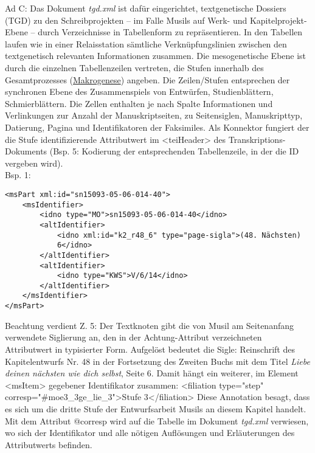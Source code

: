 \documentclass{article}
\begin{document}
        Ad C: Das Dokument \emph{tgd.xml} ist dafür eingerichtet,
                  textgenetische Dossiers (TGD) zu den Schreibprojekten – im Falle Musils auf Werk-
                  und Kapitelprojekt-Ebene – durch Verzeichnisse in Tabellenform zu repräsentieren.
                  In den Tabellen laufen wie in einer Relaisstation sämtliche Verknüpfungslinien
                  zwischen den textgenetisch relevanten Informationen zusammen. Die mesogenetische
                  Ebene ist durch die einzelnen Tabellenzeilen vertreten, die Stufen innerhalb des
                  Gesamtprozesses (\href{http://gams.uni-graz.at/o:konde.23}{Makrogenese})
                  angeben. Die Zeilen/Stufen entsprechen der synchronen Ebene des Zusammenspiels von
                  Entwürfen, Studienblättern, Schmierblättern. Die Zellen enthalten je nach Spalte
                  Informationen und Verlinkungen zur Anzahl der Manuskriptseiten, zu Seitensiglen,
                  Manuskripttyp, Datierung, Pagina und Identifikatoren der Faksimiles. Als Konnektor
                  fungiert der die Stufe identifizierende Attributwert im <teiHeader> des Transkriptions-Dokuments (Bsp. 5: Kodierung der
                  entsprechenden Tabellenzeile, in der die ID vergeben wird).\\
            
        Bsp. 1:\\
            
        \begin{verbatim}<msPart xml:id="sn15093-05-06-014-40">
    <msIdentifier>
        <idno type="MO">sn15093-05-06-014-40</idno>
        <altIdentifier>
            <idno xml:id="k2_r48_6" type="page-sigla">(48. Nächsten)
            6</idno>
        </altIdentifier>
        <altIdentifier>
            <idno type="KWS">V/6/14</idno>
        </altIdentifier>
    </msIdentifier>
</msPart>\end{verbatim}Beachtung verdient Z. 5: Der Textknoten gibt die von Musil am Seitenanfang
                  verwendete Siglierung an, den in der Achtung-Attribut verzeichneten
                  Attributwert in typisierter Form. Aufgelöst bedeutet die Sigle: Reinschrift des
                  Kapitelentwurfs Nr. 48 in der Fortsetzung des Zweiten Buchs mit dem Titel \emph{Liebe deinen nächsten wie dich selbst}, Seite 6. Damit hängt
                  ein weiterer, im Element <msItem> gegebener
                  Identifikator zusammen: <filiation type="step"
                     corresp="#moe3_3ge_lie_3">Stufe 3</filiation> Diese Annotation
                  besagt, dass es sich um die dritte Stufe der Entwurfsarbeit Musils an diesem
                  Kapitel handelt. Mit dem Attribut @corresp wird auf die Tabelle im Dokument \emph{tgd.xml
                  } verwiesen, wo sich der Identifikator und alle nötigen Auflösungen und
                  Erläuterungen des Attributwerts befinden.\\
            
\end{document}
